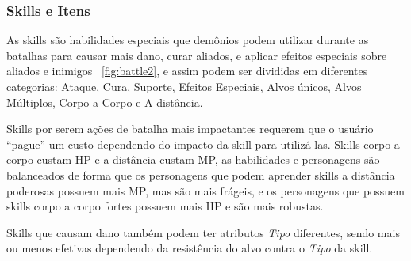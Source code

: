 \documentclass[
	12pt,				%
	openright,			%
	twoside,			%
	a4paper,			%
	english,			%
	french,				%
	spanish,			%
	brazil				%
	]{abntex2}
\begin{document}
\subsubsection{Skills e Itens}

As skills são habilidades especiais que demônios podem utilizar durante as batalhas para causar mais dano, curar aliados, e aplicar efeitos especiais sobre aliados e inimigos ~\ref{fig:battle2}, e assim podem ser divididas em diferentes categorias: Ataque, Cura, Suporte, Efeitos Especiais, Alvos únicos, Alvos Múltiplos, Corpo a Corpo e A distância.

Skills por serem ações de batalha mais impactantes requerem que o usuário “pague” um custo dependendo do impacto da skill para utilizá-las. Skills corpo a corpo custam HP e a distância custam MP, as habilidades e personagens são balanceados de forma que os personagens que podem aprender skills a distância poderosas possuem mais MP, mas são mais frágeis, e os personagens que possuem skills corpo a corpo fortes possuem mais HP e são mais robustas.

Skills que causam dano também podem ter atributos \emph{Tipo} diferentes, sendo mais ou menos efetivas dependendo da resistência do alvo contra o \emph{Tipo} da skill.
\end{document}
